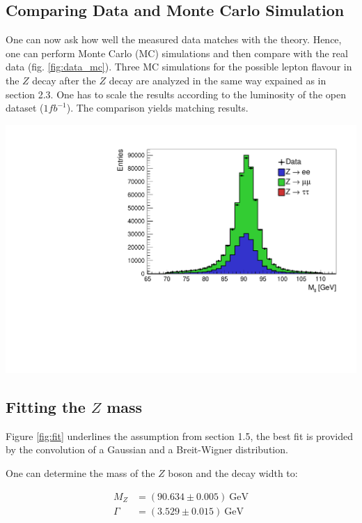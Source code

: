 \documentclass[12pt, a4paper, bibliography=totoc]{scrartcl}
\begin{document}
\begin{multicols}{2}
\subsection{Comparing Data and Monte Carlo Simulation}
One can now ask how well the measured data matches with the theory. 
Hence, one can perform Monte Carlo (MC) simulations and then compare with the real data (fig. \ref{fig:data_mc}). 
Three MC simulations for the possible lepton flavour in the $Z$ decay after the $Z$ decay are analyzed in the same way expained as in section 2.3. 
One has to scale the results according to the luminosity of the open dataset ($1 fb^{-1}$).
The comparison yields matching results.
\begin{center}
	\includegraphics[width=\linewidth]{fig/vergleich_data_mc_final.pdf}
	\label{fig:data_mc}
\end{center}


\subsection{Fitting the $Z$ mass}
Figure \ref{fig:fit} underlines the assumption from section 1.5, the best fit is provided by the convolution of a Gaussian and a Breit-Wigner distribution. 

One can determine the mass of the $Z$ boson and the decay width to: 

\begin{align}
M_Z &= (90.634 \pm 0.005) \ \text{GeV}\\
\Gamma &= (3.529 \pm 0.015) \ \text{GeV}
\end{align}


\end{multicols}
\end{document}
